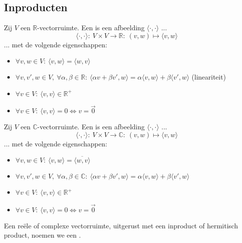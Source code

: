 \documentclass[main.tex]{subfiles}
\begin{document}
\subsection{Inproducten}
\label{sec:inproducten}

\begin{de}
  Zij $V$ een $\mathbb{R}$-vectorruimte.
  Een  is een afbeelding $\langle \cdot, \cdot\rangle$ ...
  \[ \langle \cdot , \cdot \rangle :\ V \times V \rightarrow \mathbb{R}:\ (v,w) \mapsto \langle v, w \rangle \]
  ... met de volgende eigenschappen: 
  \begin{itemize}
  \item $\forall v, w \in V:\ \langle v,w \rangle = \langle w, v \rangle$
  \item $\forall v,v',w \in V,\ \forall \alpha,\beta \in \mathbb{R}:\ \langle \alpha v + \beta v', w \rangle = \alpha \langle v,w \rangle + \beta \langle v', w \rangle $ (lineariteit)
  \item $\forall v\in V:\ \langle v,v \rangle \in \mathbb{R}^{+}$
  \item $\forall v\in V:\ \langle v,v \rangle = 0 \Leftrightarrow v = \vec{0}$
  \end{itemize}
\end{de}

\begin{de}
  Zij $V$ een $\mathbb{C}$-vectorruimte.
  Een  is een afbeelding $\langle \cdot, \cdot\rangle$ ...
  \[ \langle \cdot , \cdot \rangle :\ V \times V \rightarrow \mathbb{C}:\ (v,w) \mapsto \langle v, w \rangle \]
  ... met de volgende eigenschappen:
  \begin{itemize}
  \item $\forall v, w \in V:\ \langle v,w \rangle = \overline{\langle w, v \rangle}$
  \item $\forall v,v',w \in V,\ \forall \alpha,\beta \in \mathbb{C}:\ \langle \alpha v + \beta v', w \rangle = \alpha \langle v,w \rangle + \beta \langle v', w \rangle $
  \item $\forall v\in V:\ \langle v,v \rangle \in \mathbb{R}^{+}$
  \item $\forall v\in V:\ \langle v,v \rangle = 0 \Leftrightarrow v = \vec{0}$
  \end{itemize}
\end{de}

\begin{de}
  Een re\"ele of complexe vectorruimte, uitgerust met een inproduct of hermitisch product, noemen we een .
\end{de}
\end{document}
